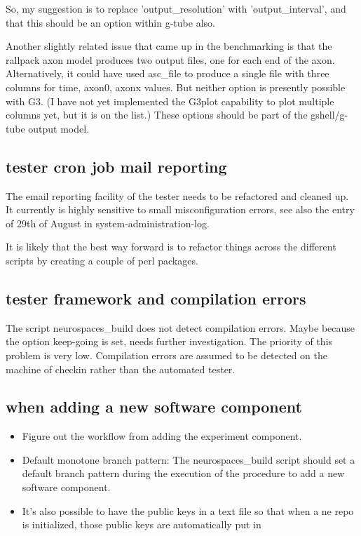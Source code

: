 \documentclass[12pt]{article}
\begin{document}
So, my suggestion is to replace 'output\_resolution' with
'output\_interval', and that this should be an option within g-tube
also.

Another slightly related issue that came up in the benchmarking is
that the rallpack axon model produces two output files, one for each
end of the axon.  Alternatively, it could have used asc\_file to
produce a single file with three columns for time, axon0, axonx
values.  But neither option is presently possible with G3.  (I have
not yet implemented the G3plot capability to plot multiple columns
yet, but it is on the list.)  These options should be part of the
gshell/g-tube output model.


\subsection{tester cron job mail reporting}

The email reporting facility of the tester needs to be refactored and
cleaned up.  It currently is highly sensitive to small
misconfiguration errors, see also the entry of 29th of August in
system-administration-log.

It is likely that the best way forward is to refactor things across
the different scripts by creating a couple of perl packages.


\subsection{tester framework and compilation errors}

The script neurospaces\_build does not detect compilation errors.
Maybe because the option keep-going is set, needs further
investigation.  The priority of this problem is very low.  Compilation
errors are assumed to be detected on the machine of checkin rather
than the automated tester.


\subsection{when adding a new software component}

\begin{itemize}
\item Figure out the workflow from adding the experiment component.
\item Default monotone branch pattern: The neurospaces\_build script
  should set a default branch pattern during the execution of the
  procedure to add a new software component.
\item It's also possible to have the public keys in a text file so
  that when a ne repo is initialized, those public keys are
  automatically put in
\end{itemize}
\end{document}
